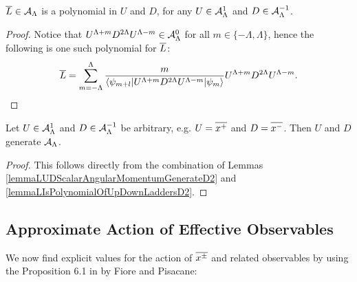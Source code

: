 \begin{lemma}\label{lemmaLIsPolynomialOfUpDownLaddersD2}
$\overline{L} \in \mathcal A_\Lambda$ is a polynomial in $U$ and $D$, for any $U \in \mathcal A^1_\Lambda$ and $D \in \mathcal A^{-1}_\Lambda$.
\end{lemma}
\begin{proof}
Notice that $U^{\Lambda+m} D^{2\Lambda}U^{\Lambda-m} \in \mathcal A^0_\Lambda$ for all $m \in \{-\Lambda, \Lambda\}$, hence the following is one such polynomial for $\overline{L}$:
\begin{equation}
    \overline{L} = \sum_{m = -\Lambda}^\Lambda \frac{m}{\langle \psi_{m+l}| U^{\Lambda+m} D^{2\Lambda}U^{\Lambda-m} | \psi_{m}\rangle} U^{\Lambda+m} D^{2\Lambda}U^{\Lambda-m}.
\end{equation}
\end{proof}

\begin{theorem}\label{theoremRaisingAndLoweringAribtraryOperatorsGenerateD2}
Let $U \in \mathcal A^1_\Lambda$ and $D \in \mathcal A^{-1}_\Lambda$ be arbitrary, e.g. $U = \overline{x^+}$ and $D = \overline{x^-}$. Then $U$ and $D$ generate $\mathcal A_\Lambda$.
\end{theorem}
\begin{proof}
This follows directly from the combination of Lemmas \ref{lemmaLUDScalarAngularMomentumGenerateD2} and \ref{lemmaLIsPolynomialOfUpDownLaddersD2}.
\end{proof}

\subsection{Approximate Action of Effective Observables}

We now find explicit values for the action of $\overline{x^\pm}$ and related observables by using the Proposition 6.1 in \cite{Fiore2018} by Fiore and Pisacane:

